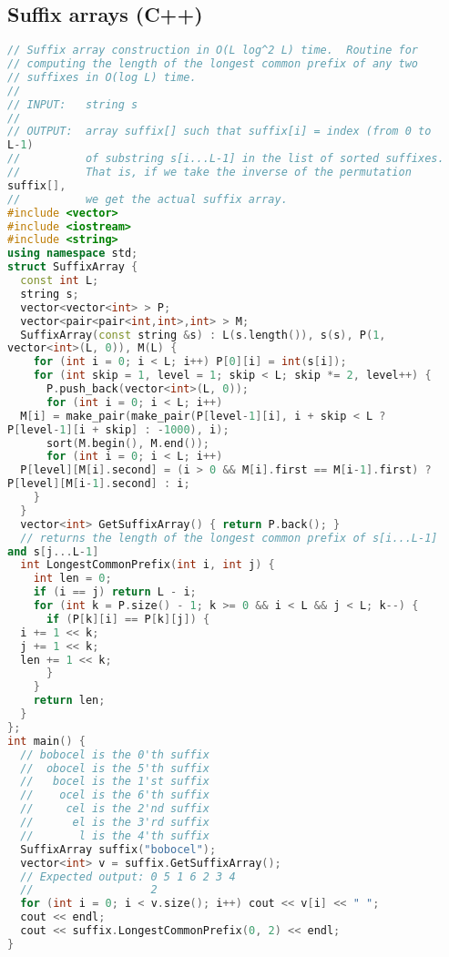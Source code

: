 \subsection{Suffix arrays (C++)}
\begin{lstlisting}[language=C++]
// Suffix array construction in O(L log^2 L) time.  Routine for
// computing the length of the longest common prefix of any two
// suffixes in O(log L) time.
//
// INPUT:   string s
//
// OUTPUT:  array suffix[] such that suffix[i] = index (from 0 to 
L-1)
//          of substring s[i...L-1] in the list of sorted suffixes.
//          That is, if we take the inverse of the permutation 
suffix[],
//          we get the actual suffix array.
#include <vector>
#include <iostream>
#include <string>
using namespace std;
struct SuffixArray {
  const int L;
  string s;
  vector<vector<int> > P;
  vector<pair<pair<int,int>,int> > M;
  SuffixArray(const string &s) : L(s.length()), s(s), P(1, 
vector<int>(L, 0)), M(L) {
    for (int i = 0; i < L; i++) P[0][i] = int(s[i]);
    for (int skip = 1, level = 1; skip < L; skip *= 2, level++) {
      P.push_back(vector<int>(L, 0));
      for (int i = 0; i < L; i++) 
  M[i] = make_pair(make_pair(P[level-1][i], i + skip < L ? 
P[level-1][i + skip] : -1000), i);
      sort(M.begin(), M.end());
      for (int i = 0; i < L; i++) 
  P[level][M[i].second] = (i > 0 && M[i].first == M[i-1].first) ? 
P[level][M[i-1].second] : i;
    }    
  }
  vector<int> GetSuffixArray() { return P.back(); }
  // returns the length of the longest common prefix of s[i...L-1] 
and s[j...L-1]
  int LongestCommonPrefix(int i, int j) {
    int len = 0;
    if (i == j) return L - i;
    for (int k = P.size() - 1; k >= 0 && i < L && j < L; k--) {
      if (P[k][i] == P[k][j]) {
  i += 1 << k;
  j += 1 << k;
  len += 1 << k;
      }
    }
    return len;
  }
};
int main() {
  // bobocel is the 0'th suffix
  //  obocel is the 5'th suffix
  //   bocel is the 1'st suffix
  //    ocel is the 6'th suffix
  //     cel is the 2'nd suffix
  //      el is the 3'rd suffix
  //       l is the 4'th suffix
  SuffixArray suffix("bobocel");
  vector<int> v = suffix.GetSuffixArray();
  // Expected output: 0 5 1 6 2 3 4
  //                  2
  for (int i = 0; i < v.size(); i++) cout << v[i] << " ";
  cout << endl;
  cout << suffix.LongestCommonPrefix(0, 2) << endl;
}
\end{lstlisting}
